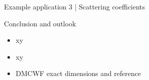\documentclass{beamer}
\begin{document}
\begin{frame}{Example application 3 | Scattering coefficients}

    \begin{figure}
        \centering
        \scalebox{0.8}{}
    \end{figure}

\end{frame}

\begin{frame}{Conclusion and outlook}

    \begin{itemize}
        \item<1-> xy
        \item<2-> xy
        \item<3-> DMCWF exact dimensions and reference
    \end{itemize}

\end{frame}
\end{document}
